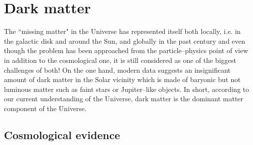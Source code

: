 \documentclass[paper=a4, fontsize=11pt]{scrartcl} %
\numberwithin{equation}{section} %
\numberwithin{figure}{section} %
\numberwithin{table}{section} %
\begin{document}


\newpage
\section{Dark matter}
The ``missing matter" in the Universe has represented itself both locally, i.e. in the galactic disk and around the Sun, and globally in the past century and even though the problem has been approached from the particle--physics point of view in addition to the cosmological one, it is still considered as one of the biggest challenges of both! On the one hand, modern data suggests an insignificant amount of dark matter in the Solar vicinity which is made of baryonic but not luminous matter such as faint stars or Jupiter--like objects. In short, according to our current understanding of the Universe, dark matter is the dominant matter component of the Universe.

\subsection{Cosmological evidence}
\end{document}
